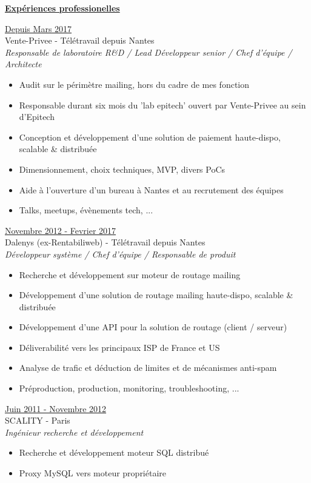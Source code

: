 \documentclass[a4paper,10pt]{letter}
\begin{document}
\underline{\textbf{Exp\'eriences professionelles}}\\
\begin{description}
\item{\underline{Depuis Mars 2017}}\\
  Vente-Privee - T\'el\'etravail depuis Nantes\\
  \textit{Responsable de laboratoire R\&D / Lead D\'eveloppeur senior / Chef d'\'equipe / Architecte}
  \begin{itemize}
  \item Audit sur le p\'erim\`etre mailing, hors du cadre de mes fonction
  \item Responsable durant six mois du 'lab epitech' ouvert par Vente-Privee au sein d'Epitech
  \item Conception et d\'eveloppement d'une solution de paiement haute-dispo, scalable \& distribu\'ee
  \item Dimensionnement, choix techniques, MVP, divers PoCs
  \item Aide \`a l'ouverture d'un bureau \`a Nantes et au recrutement des \'equipes
  \item Talks, meetups, \'ev\`enements tech, ...\\
  \end{itemize}

\item{\underline{Novembre 2012 - Fevrier 2017}}\\
  Dalenys (ex-Rentabiliweb) - T\'el\'etravail depuis Nantes\\
  \textit{D\'eveloppeur syst\`eme / Chef d'\'equipe / Responsable de produit}
  \begin{itemize}
  \item Recherche et d\'eveloppement sur moteur de routage mailing
  \item D\'eveloppement d'une solution de routage mailing haute-dispo, scalable \& distribu\'ee
  \item D\'eveloppement d'une API pour la solution de routage (client / serveur)
  \item D\'eliverabilit\'e vers les principaux ISP de France et US
  \item Analyse de trafic et d\'eduction de limites et de m\'ecanismes anti-spam
  \item Pr\'eproduction, production, monitoring, troubleshooting, ...\\
  \end{itemize}

\item{\underline{Juin 2011 - Novembre 2012}}\\
  SCALITY - Paris\\
  \textit{Ing\'enieur recherche et d\'eveloppement}
  \begin{itemize}
  \item Recherche et d\'eveloppement moteur SQL distribu\'e
  \item Proxy MySQL vers moteur propri\'etaire\\
  \end{itemize}


\end{description}
\end{document}
